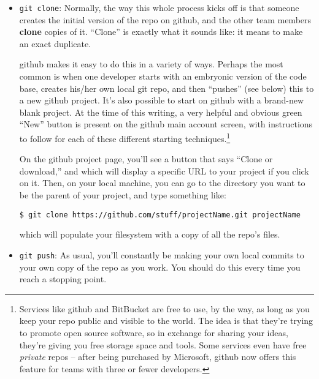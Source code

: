 \begin{itemize}
\item \texttt{git clone}: Normally, the way this whole process kicks off is
that someone creates the initial version of the repo on github, and the other
team members \textbf{clone} copies of it. ``Clone'' is exactly what it sounds
like: it means to make an exact duplicate.

github makes it easy to do this in a variety of ways. Perhaps the most common
is when one developer starts with an embryonic version of the code base,
creates his/her own local git repo, and then ``pushes'' (see below) this to a
new github project. It's also possible to start on github with a brand-new
blank project. At the time of this writing, a very helpful and obvious green
``New'' button is present on the github main account screen, with instructions
to follow for each of these different starting techniques.\footnote{Services
like github and BitBucket are free to use, by the way, as long as you keep your
repo public and visible to the world. The idea is that they're trying to
promote open source software, so in exchange for sharing your ideas, they're
giving you free storage space and tools. Some services even have free
\textit{private} repos -- after being purchased by Microsoft, github now offers
this feature for teams with three or fewer developers.}

On the github project page, you'll see a button that says ``Clone or
download,'' and which will display a specific URL to your project if you click
on it. Then, on your local machine, you can go to the directory you want to be
the parent of your project, and type something like:

\begin{Verbatim}[fontsize=\scriptsize,samepage=true,frame=none]
$ git clone https://github.com/stuff/projectName.git projectName
\end{Verbatim}

which will populate your filesystem with a copy of all the repo's files.

\item \texttt{git push}: As usual, you'll constantly be making your own local
commits to your own copy of the repo as you work. You should do this every
time you reach a stopping point.


\end{itemize}
